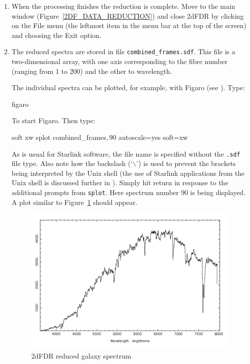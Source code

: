 \documentclass[chapters,twoside,11pt]{starlink}
\begin{document}
\begin{enumerate}
  \item When the processing finishes the reduction is complete.  Move
   to the main window (Figure~\ref{2DF_DATA_REDUCTION}) and close
   2dFDR by clicking on the \textsf{File} menu (the leftmost item in the
   menu bar at the top of the screen) and choosing the \textsf{Exit}
   option.

  \item The reduced spectra are stored in file \texttt{combined\_frames.sdf}.  This file is a two-dimensional array, with one
   axis corresponding to the fibre number (ranging from 1 to 200) and the
   other to wavelength.

   The individual spectra can be plotted, for example, with Figaro
   (see \cite{SUN86}).  Type:

\begin{terminalv}
figaro
\end{terminalv}

   To start Figaro.  Then type:

\begin{terminalv}
soft xw
splot combined_frames\(,90\) autoscale=yes soft=xw
\end{terminalv}

   As is usual for Starlink software, the file name is specified without
   the \texttt{.sdf} file type.  Also note how the backslash (`$\backslash$')
   is used to prevent the brackets being interpreted by the Unix shell
   (the use of Starlink applications from the Unix shell is discussed
   further in \/\cite{SC4}).
   Simply hit return in response to the additional prompts from \texttt{splot}.  Here spectrum number 90 is being displayed.  A plot similar
   to Figure~\ref{2DF_SPLOT} should appear.

  \begin{figure}[htbp]
     \centering
     \includegraphics[totalheight=3.6in]{sc14_2df_splot}
     \caption{2dFDR reduced galaxy spectrum
     \label{2DF_SPLOT} }
  \end{figure}

\end{enumerate}
\end{document}
